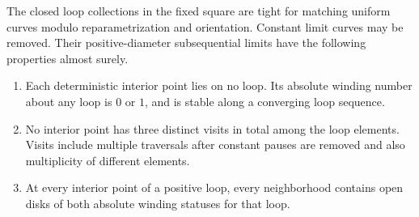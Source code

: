 \begin{lemma}\label{loop:geometry}
The closed loop collections in the fixed square are tight for matching
uniform curves modulo reparametrization and orientation.  Constant
limit curves may be removed.  Their positive-diameter subsequential
limits have the following properties almost surely.
\begin{enumerate}[label=\textup{(\roman*)}]
\item Each deterministic interior point lies on no loop.  Its absolute
winding number about any loop is $0$ or $1$, and is stable along a
converging loop sequence.
\item No interior point has three distinct visits in total among the
loop elements.  Visits include multiple traversals after constant
pauses are removed and also multiplicity of different elements.
\item At every interior point of a positive loop, every neighborhood
contains open disks of both absolute winding statuses for that loop.
\end{enumerate}
\end{lemma}

